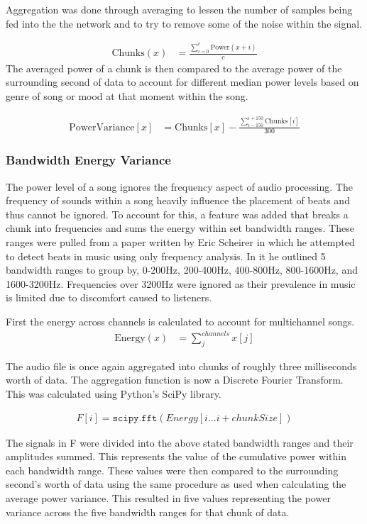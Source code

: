 Aggregation was done through averaging to lessen the number of samples being fed into the the network and to try to remove some of the noise within the signal.

\begin{align*}
	\text{Chunks}(x) &= \frac{\sum_{i=0}^{c}\text{Power}(x+i)}{c}
\end{align*}
The averaged power of a chunk is then compared to the average power of the surrounding second of data to account for different median power levels based on genre of song or mood at that moment within the song.

\begin{align*}
	\text{PowerVariance}[x] &= \text{Chunks}[x] - \frac{\sum_{i-150}^{i+150}\text{Chunks}[i]}{300}
\end{align*}

\subsubsection{Bandwidth Energy Variance}
The power level of a song ignores the frequency aspect of audio processing. The frequency of sounds within a song heavily influence the placement of beats and thus cannot be ignored. To account for this, a feature was added that breaks a chunk into frequencies and sums the energy within set bandwidth ranges. These ranges were pulled from a paper written by Eric Scheirer in which he attempted to detect beats in music using only frequency analysis. In it he outlined 5 bandwidth ranges to group by, 0-200Hz, 200-400Hz, 400-800Hz, 800-1600Hz, and 1600-3200Hz\cite{bandwidthbreaks}. Frequencies over 3200Hz were ignored as their prevalence in music is limited due to discomfort caused to listeners.

First the energy across channels is calculated to account for multichannel songs.
\begin{align*}
 	\text{Energy}(x) &= \sum_j^{channels} x[j]
 \end{align*}

 The audio file is once again aggregated into chunks of roughly three milliseconds worth of data. The aggregation function is now a Discrete Fourier Transform. This was calculated using Python's SciPy library.

 \begin{align*}
 	F[i] =  \texttt{scipy.fft}(Energy[i \dots i+chunkSize])
 \end{align*}

The signals in F were divided into the above stated bandwidth ranges and their amplitudes summed. This represents the value of the cumulative power within each bandwidth range. These values were then compared to the surrounding second's worth of data using the same procedure as used when calculating the average power variance. This resulted in five values representing the power variance across the five bandwidth ranges for that chunk of data.

